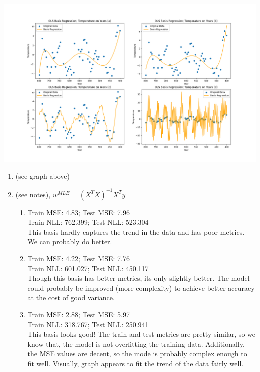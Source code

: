 \documentclass[submit]{harvardml}
\begin{document}
\begin{solution}

\noindent 
\begin{center}
  \includegraphics[width=0.9\linewidth]{Problem3.png}
\end{center}
\begin{enumerate}
  \item (see graph above)
  \item (see notes), $w^{MLE} = (X^TX)^{-1}X^Ty$
    \begin{enumerate}
      \item Train MSE: 4.83; Test MSE: 7.96\\
      Train NLL: 762.399; Test NLL: 523.304\\
      This basis hardly captures the trend in the data and has
      poor metrics. We can probably do better.
      \item Train MSE: 4.22; Test MSE: 7.76\\
      Train NLL: 601.027; Test NLL: 450.117\\
      Though this basis has better metrics, its only slightly better.
      The model could probably be improved (more complexity) to achieve
      better accuracy at the cost of good variance.
      \item Train MSE: 2.88; Test MSE: 5.97\\
      Train NLL: 318.767; Test NLL: 250.941\\
      This basis looks good! The train and test metrics
      are pretty similar, so we know that, the model is not overfitting the
      training data. Additionally, the MSE values are decent, so 
      the mode is probably complex enough to fit well.
      Visually, graph appears to fit the trend of the data fairly well.

\end{enumerate}
\end{enumerate}
\end{solution}
\end{document}
